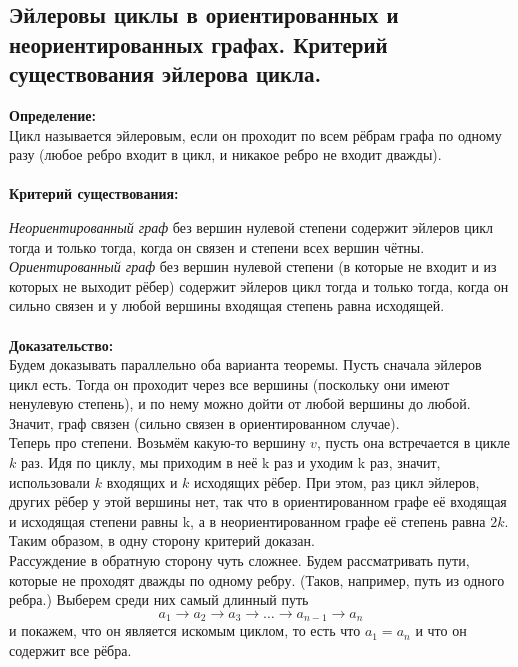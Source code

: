 \subsection{Эйлеровы циклы в ориентированных и неориентированных графах. Критерий существования эйлерова цикла.}
	
\textbf{Определение:} \\
Цикл называется эйлеровым, если он проходит по всем рёбрам графа по одному
разу (любое ребро входит в цикл, и никакое ребро не входит дважды).
\\ \\

\noindent \textbf{Критерий существования:}

\textit{Неориентированный граф} без вершин нулевой степени содержит эйлеров цикл тогда и только тогда, когда он связен и степени всех вершин чётны. \\ 

\textit{Ориентированный граф} без вершин нулевой степени (в которые не
входит и из которых не выходит рёбер) содержит эйлеров цикл тогда и только
тогда, когда он сильно связен и у любой вершины входящая степень равна исходящей.	\\ \\ 

\noindent \textbf{Доказательство:} \\
\indent Будем доказывать параллельно оба варианта теоремы. Пусть сначала эйлеров цикл есть. Тогда он проходит через все вершины (поскольку они имеют ненулевую степень), и по нему можно дойти от любой вершины до любой. Значит, граф связен (сильно связен в ориентированном случае). \\

Теперь про степени. Возьмём какую-то вершину $v$, пусть она встречается в цикле
$k$ раз. Идя по циклу, мы приходим в неё k раз и уходим k раз, значит, использовали
$k$ входящих и $k$ исходящих рёбер. При этом, раз цикл эйлеров, других рёбер у этой
вершины нет, так что в ориентированном графе её входящая и исходящая степени
равны k, а в неориентированном графе её степень равна $2k$. Таким образом, в одну
сторону критерий доказан. \\ 

Рассуждение в обратную сторону чуть сложнее. Будем рассматривать пути, которые не проходят дважды по одному ребру. (Таков, например, путь из одного ребра.) Выберем среди них самый длинный путь
\[
a_1 \to a_2 \to a_3 \to \dots \to a_{n - 1} \to a_n
\]
и покажем, что он является искомым циклом, то есть что $a_1 = a_n$ и что он содержит
все рёбра. \\ 

